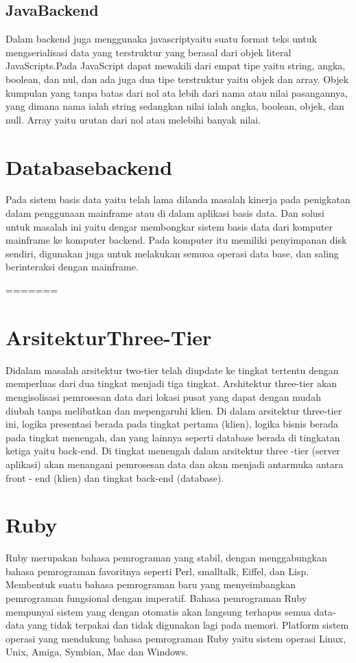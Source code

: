 \subsection{JavaBackend}
Dalam backend juga menggunaka javascriptyaitu suatu format teks untuk mengserialisasi data yang terstruktur yang berasal dari objek literal JavaScripts.Pada JavaScript dapat mewakili dari empat tipe yaitu string, angka, boolean, dan nul, dan ada juga dua tipe terstruktur yaitu objek dan array. Objek kumpulan yang tanpa batas dari nol ata lebih dari nama atau nilai pasangannya, yang dimana nama ialah string sedangkan nilai ialah angka, boolean, objek, dan null. Array yaitu urutan dari nol atau melebihi banyak nilai.


\section{Databasebackend}
Pada sistem basis data yaitu telah lama dilanda masalah kinerja pada penigkatan dalam penggunaan mainframe atau di dalam aplikasi basis data. Dan solusi untuk masalah ini yaitu dengar membongkar sistem basis data dari komputer mainframe ke komputer backend. Pada komputer itu memiliki penyimpanan disk sendiri, digunakan juga untuk melakukan semuoa operasi data base, dan saling berinteraksi dengan mainframe.

=======
\section{ArsitekturThree-Tier}
Didalam masalah arsitektur two-tier telah diupdate ke tingkat tertentu dengan memperluas dari dua tingkat menjadi tiga tingkat.
Arshitektur three-tier akan mengisolisasi pemrosesan data dari lokasi pusat yang dapat dengan mudah diubah tanpa melibatkan dan mepengaruhi klien. Di dalam arsitektur three-tier ini, logika presentasi berada pada tingkat pertama (klien), logika bisnis berada pada 
tingkat menengah, dan yang lainnya seperti database berada di tingkatan ketiga yaitu back-end. Di tingkat menengah dalam
arsitektur three -tier (server aplikasi) akan menangani pemrosesan data dan akan menjadi antarmuka antara front - end (klien) dan
tingkat back-end (database).

\section{Ruby}
Ruby merupakan bahasa pemrograman yang stabil, dengan menggabungkan bahasa pemrograman favoritnya seperti Perl, smalltalk, Eiffel, dan Lisp.
Membentuk suatu bahasa pemrograman baru yang menyeimbangkan pemrograman fungsional dengan imperatif.
Bahasa pemrograman Ruby mempunyai sistem yang dengan otomatis akan langsung terhapus semua data-data yang tidak terpakai dan tidak digunakan lagi pada memori. 
Platform sistem operasi yang mendukung bahasa pemrograman Ruby yaitu sistem operasi Linux, Unix, Amiga, Symbian, Mac dan Windows.

